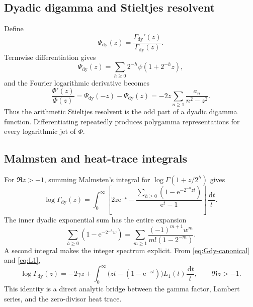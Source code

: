 \documentclass[11pt,oneside]{article}
\theoremstyle{definition}
\theoremstyle{remark}
\newcommand{\e}{\mathrm e}
\newcommand{\dd}{\,\mathrm d}
\newcommand{\GammaDy}{\Gamma_{\!\mathrm{dy}}}
\begin{document}
\subsection{Dyadic digamma and Stieltjes resolvent}

Define
\begin{equation}
 \Psi_{\mathrm{dy}}(z)=\frac{\GammaDy'(z)}{\GammaDy(z)}.
\end{equation}
Termwise differentiation gives
\begin{equation}
 \Psi_{\mathrm{dy}}(z)=\sum_{h\ge0}2^{-h}\psi(1+2^{-h}z),                 \label{eq:dyadic-digamma}
\end{equation}
and the Fourier logarithmic derivative becomes
\begin{equation}
 \boxed{\quad
 \frac{\Phi'(z)}{\Phi(z)}
 =\Psi_{\mathrm{dy}}(-z)-\Psi_{\mathrm{dy}}(z)
 =-2z\sum_{n\ge1}\frac{a_n}{n^2-z^2}.
 \quad}                                                  \label{eq:digamma-resolvent}
\end{equation}
Thus the arithmetic Stieltjes resolvent is the odd part of a dyadic digamma function.
Differentiating repeatedly produces polygamma representations for every logarithmic jet of
$\Phi$.

\subsection{Malmsten and heat-trace integrals}

For $\Re z>-1$, summing Malmsten's integral for $\log\Gamma(1+z/2^h)$ gives
\begin{equation}
 \log\GammaDy(z)=\int_0^\infty
 \left[
 2z\e^{-t}-\frac{\displaystyle\sum_{h\ge0}
 (1-\e^{-2^{-h}zt})}{\e^t-1}
 \right]\frac{\dd t}{t}.                               \label{eq:GammaDy-Malmsten}
\end{equation}
The inner dyadic exponential sum has the entire expansion
\begin{equation}
 \sum_{h\ge0}(1-\e^{-2^{-h}w})
 =\sum_{m\ge1}\frac{(-1)^{m+1}w^m}{m!(1-2^{-m})}.       \label{eq:dyadic-exponential-sum}
\end{equation}
A second integral makes the integer spectrum explicit.  From
\eqref{eq:Gdy-canonical} and \eqref{eq:L1},
\begin{equation}
 \boxed{\quad
 \log\GammaDy(z)
 =-2\gamma z+\int_0^\infty
 \bigl(zt-(1-\e^{-zt})\bigr)L_1(t)\frac{\dd t}{t},
 \qquad \Re z>-1.
 \quad}                                                  \label{eq:GammaDy-heat-integral}
\end{equation}
This identity is a direct analytic bridge between the gamma factor, Lambert series, and the
zero-divisor heat trace.
\end{document}
